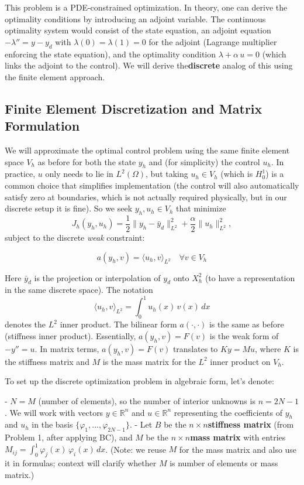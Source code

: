 \documentclass[a4paper,10pt]{article}
\begin{document}
This problem is a PDE-constrained optimization. In theory, one can derive the optimality conditions by introducing an adjoint variable. The continuous optimality system would consist of the state equation, an adjoint equation \(-\lambda'' = y - y_d\) with \(\lambda(0)=\lambda(1)=0\) for the adjoint (Lagrange multiplier enforcing the state equation), and the optimality condition \(\lambda + \alpha\,u = 0\) (which links the adjoint to the control). We will derive the\textbf{discrete} analog of this using the finite element approach.

\subsection{Finite Element Discretization and Matrix Formulation}
We will approximate the optimal control problem using the same finite element space \(V_h\) as before for both the state \(y_h\) and (for simplicity) the control \(u_h\). In practice, \(u\) only needs to lie in \(L^2(\Omega)\), but taking \(u_h \in V_h\) (which is \(H^1_0\)) is a common choice that simplifies implementation (the control will also automatically satisfy zero at boundaries, which is not actually required physically, but in our discrete setup it is fine). So we seek \(y_h, u_h \in V_h\) that minimize
\[J_h(y_h, u_h) = \frac{1}{2}\|y_h - \bar{y}_d\|^2_{L^2} + \frac{\alpha}{2}\|u_h\|^2_{L^2},\]
subject to the discrete \emph{weak} constraint:

\[
	a(y_h, v) = {\langle u_h, v \rangle}_{L^2}\quad \forall v \in V_h
\]


Here \(\bar{y}_d\) is the projection or interpolation of \(y_d\) onto \(X_h^2\) (to have a representation in the same discrete space).
The notation
\[
	{\langle u_h, v \rangle}_{L^2} = \int_0^1 u_h(x)\,v(x)\,dx
\]
denotes the \(L^2\) inner product. The bilinear form \(a(\cdot,\cdot)\) is the same as before (stiffness inner product).
Essentially, \(a(y_h,v) = F(v)\) is the weak form of \(-y''=u\). In matrix terms, \(a(y_h,v)=F(v)\) translates to \(K y = M u\), where \(K\) is the stiffness matrix and \(M\) is the mass matrix for the \(L^2\) inner product on \(V_h\).

To set up the discrete optimization problem in algebraic form, let's denote:

- \(N = M\) (number of elements), so the number of interior unknowns is \(n = 2N-1\). We will work with vectors \(y \in \mathbb{R}^n\) and \(u \in \mathbb{R}^n\) representing the coefficients of \(y_h\) and \(u_h\) in the basis \(\{\varphi_1,...,\varphi_{2N-1}\}\).
- Let \(B\) be the \(n \times n\)\textbf{stiffness matrix} (from Problem 1, after applying BC), and \(M\) be the \(n \times n\)\textbf{mass matrix} with entries \(M_{ij} = \int_0^1 \varphi_j(x)\,\varphi_i(x)\,dx\). (Note: we reuse \(M\) for the mass matrix and also use it in formulas; context will clarify whether \(M\) is number of elements or mass matrix.)
\end{document}
